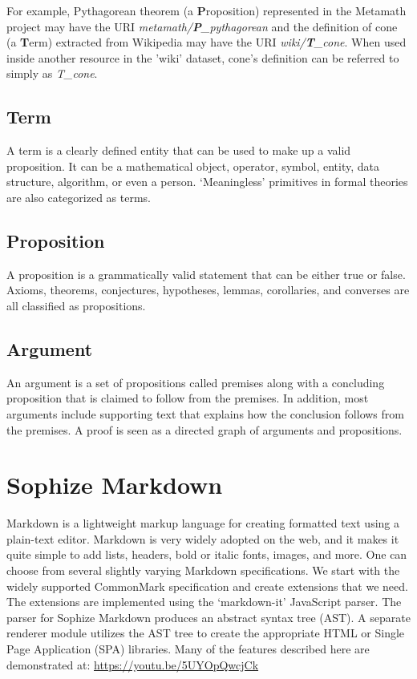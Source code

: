 \documentclass[a4paper]{article}
\begin{document}
For example, Pythagorean theorem (a \textbf{P}roposition) represented in the Metamath project may have the URI \emph{metamath/\textbf{P}\_pythagorean} and the definition of cone (a \textbf{T}erm) extracted from Wikipedia may have the URI \emph{wiki/\textbf{T}\_cone}. When used inside another resource in the 'wiki' dataset, cone's definition can be referred to simply as \emph{T\_cone}.


\subsection*{Term}

A term is a clearly defined entity that can be used to make up a valid proposition. It can be a mathematical object, operator, symbol, entity, data structure, algorithm, or even a person. `Meaningless' primitives in formal theories are also categorized as terms.


\subsection*{Proposition}

A proposition is a grammatically valid statement that can be either true or false. Axioms, theorems, conjectures, hypotheses, lemmas, corollaries, and converses are all classified as propositions.


\subsection*{Argument}

An argument is a set of propositions called premises along with a concluding proposition that is claimed to follow from the premises. In addition, most arguments include supporting text that explains how the conclusion follows from the premises. A proof is seen as a directed graph of arguments and propositions.


\section{Sophize Markdown}

Markdown is a lightweight markup language for creating formatted text using a plain-text editor. Markdown is very widely adopted on the web, and it makes it quite simple to add lists, headers, bold or italic fonts, images, and more. One can choose from several slightly varying Markdown specifications. We start with the widely supported CommonMark specification and create extensions that we need. The extensions are implemented using the `markdown-it' \cite{markdown_it} JavaScript parser. The parser for Sophize Markdown produces an abstract syntax tree (AST). A separate renderer module utilizes the AST tree to create the appropriate HTML or Single Page Application (SPA) libraries. Many of the features described here are demonstrated at: \url{https://youtu.be/5UYOpQwcjCk}
\end{document}
